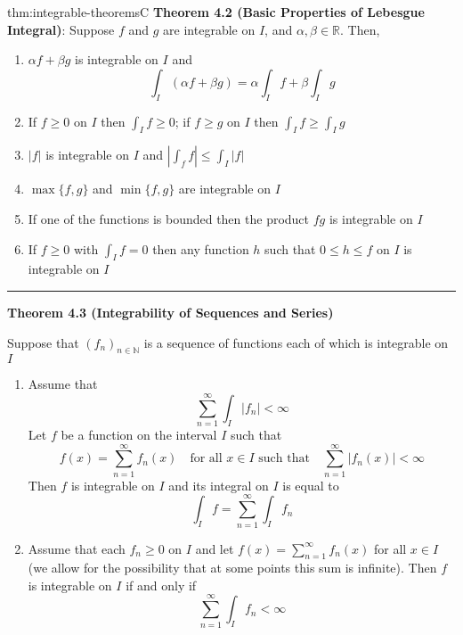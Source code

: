 \documentclass[landscape, 8pt]{extarticle}
\begin{document}
\begin{multicols}{3}
\begin{thm}{thm:integrable-theorems}{C}
	\vspace{-5pt}
	\textbf{Theorem 4.2 (Basic Properties of Lebesgue Integral)}: Suppose $f$ and $g$ are integrable on $I$, and $\alpha, \beta\in \mathbb{R}$. Then,
	\vspace{-5pt}
	\begin{enumerate}
		\setlength\itemsep{0em}
		\item $\alpha f + \beta g$ is integrable on $I$ and
		\[\int_{I} (\alpha f + \beta g)=\alpha\int_{I} f+\beta\int_{I} g\]
		\item If $f\ge 0$ on $I$ then $\int_{I}f\ge 0$; if $f\ge g$ on $I$ then $\int_{I}f\ge \int_{I}g$
		\item $\lvert f \rvert$ is integrable on $I$ and $\left\lvert  \int_{f}f  \right\rvert\le \int_{I}\lvert f \rvert$
		\item $\max\{f,g\}$ and $\min\{f,g\}$ are integrable on $I$
		\item If one of the functions is bounded then the product $fg$ is integrable on $I$
		\item If $f\ge 0$ with $\int_{I}f=0$ then any function $h$ such that $0\le h\le f$ on $I$ is integrable on $I$
	\end{enumerate}

	\vspace{-7pt}
	\noindent\rule{\textwidth}{0.2pt}
	\textbf{Theorem 4.3 (Integrability of Sequences and Series)}

	Suppose that $(f_{n})_{n\in\mathbb{N}}$ is a sequence of functions each of which is integrable on $I$
	\begin{enumerate}
		\setlength\itemsep{0em}
		\item Assume that
			\vspace{-5pt}
		\[\sum_{n=1}^{\infty} \int_{I} \lvert f_{n} \rvert <\infty\]
		Let $f$ be a function on the interval $I$ such that
		\[f(x)=\sum_{n=1}^{\infty} f_{n}(x)\quad\text{for all } x\in I\text{ such that}\quad \sum_{n=1}^{\infty} \lvert f_{n}(x) \rvert <\infty\]
		Then $f$ is integrable on $I$ and its integral on $I$ is equal to
		\[\int_{I} f=\sum_{n=1}^{\infty} \int_{I} f_{n}\]
		\item Assume that each $f_{n}\ge 0$ on $I$ and let $f(x)=\sum_{n=1}^{\infty}f_{n}(x)$ for all $x\in I$ (we allow for the possibility that at some points this sum is infinite). Then $f$ is integrable on $I$ if and only if
		\[\sum_{n=1}^{\infty} \int_{I} f_{n}<\infty\]
	\end{enumerate}


\end{thm}
\end{multicols}
\end{document}
